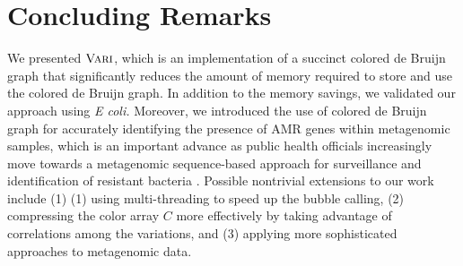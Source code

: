 \section{Concluding Remarks}
\label{sec:conclusion}

We presented $\mbox{\rm {\sc Vari}}$, which is an implementation of a succinct colored de Bruijn graph that significantly reduces the amount of memory required to store and use the colored de Bruijn graph. In addition to the memory savings, we validated our approach using {\em E coli.} Moreover, we introduced the use of colored de Bruijn graph for accurately identifying the presence of AMR genes within metagenomic samples, which is an important advance as public health officials increasingly move towards a metagenomic sequence-based approach for surveillance and identification of resistant bacteria \cite{baquero_metagenomic_epi, port_2014_metagenomics_AMR_monitoring,FAOActionPlan2016}. Possible nontrivial extensions to our work include (1)
(1) using multi-threading to speed up the bubble calling, (2) compressing the color array $C$ more effectively by taking advantage of correlations among the variations, and (3) applying more sophisticated approaches to metagenomic data.





